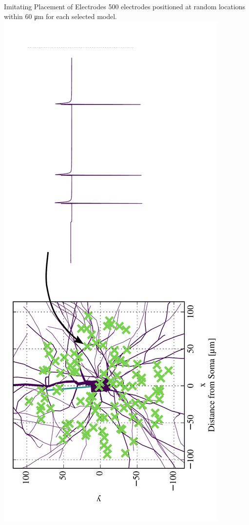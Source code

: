 \documentclass{beamer}
\begin{document}
\begin{frame}{Imitating Placement of Electrodes}
    500 electrodes positioned at random locations within 60 \si{\micro\metre} for 
    each selected model.
    \centering
    \includegraphics[angle=-90,width=\textwidth]{images/electrodes.pdf}
\end{frame}
\end{document}
